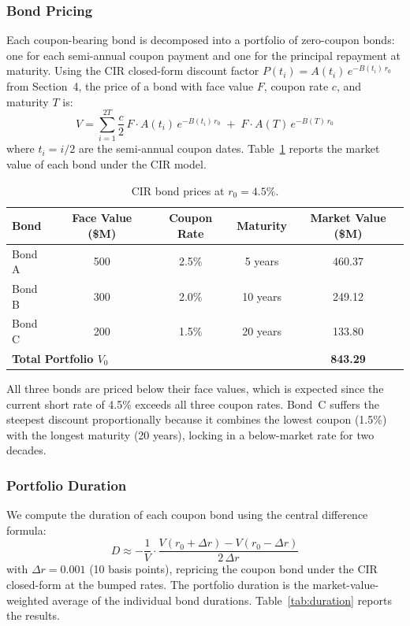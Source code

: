 \documentclass[12pt, a4paper]{article}
\begin{document}
\subsubsection{Bond Pricing}

Each coupon-bearing bond is decomposed into a portfolio of zero-coupon bonds: one for each semi-annual coupon payment and one for the principal repayment at maturity. Using the CIR closed-form discount factor $P(t_i) = A(t_i)\,e^{-B(t_i)\,r_0}$ from Section~4, the price of a bond with face value $F$, coupon rate $c$, and maturity $T$ is:
\[
V = \sum_{i=1}^{2T} \frac{c}{2}\,F \cdot A(t_i)\,e^{-B(t_i)\,r_0} \;+\; F \cdot A(T)\,e^{-B(T)\,r_0}
\]
where $t_i = i/2$ are the semi-annual coupon dates. Table~\ref{tab:bond_prices} reports the market value of each bond under the CIR model.

\begin{table}[H]
\centering
\caption{CIR bond prices at $r_0 = 4.5\%$.}
\label{tab:bond_prices}
\begin{tabular}{lcccc}
\toprule
Bond & Face Value (\$M) & Coupon Rate & Maturity & Market Value (\$M) \\
\midrule
Bond A & 500 & 2.5\% & 5 years  & 460.37 \\
Bond B & 300 & 2.0\% & 10 years & 249.12 \\
Bond C & 200 & 1.5\% & 20 years & 133.80 \\
\midrule
\multicolumn{4}{l}{\textbf{Total Portfolio $V_0$}} & \textbf{843.29} \\
\bottomrule
\end{tabular}
\end{table}

All three bonds are priced below their face values, which is expected since the current short rate of 4.5\% exceeds all three coupon rates. Bond~C suffers the steepest discount proportionally because it combines the lowest coupon (1.5\%) with the longest maturity (20 years), locking in a below-market rate for two decades.

\subsubsection{Portfolio Duration}

We compute the duration of each coupon bond using the central difference formula:
\[
D \approx -\frac{1}{V}\cdot\frac{V(r_0+\Delta r) - V(r_0-\Delta r)}{2\,\Delta r}
\]
with $\Delta r = 0.001$ (10 basis points), repricing the coupon bond under the CIR closed-form at the bumped rates. The portfolio duration is the market-value-weighted average of the individual bond durations. Table~\ref{tab:duration} reports the results.
\end{document}
